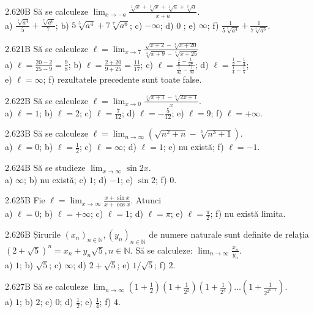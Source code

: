 \documentclass[11pt]{article}
\begin{document}
2.620B Să se calculeze $\lim _{x \rightarrow-a} \frac{\sqrt[5]{x}+\sqrt[7]{x}+\sqrt[3]{a}+\sqrt[7]{a}}{x+a}$.\\ a) $\frac{\sqrt[5]{a^{4}}}{5}+\frac{\sqrt[7]{a^{6}}}{7}$; b) $5 \sqrt[5]{a^{4}}+7 \sqrt[7]{a^{6}}$; c) $-\infty$; d) 0 ; e) $\infty$; f) $\frac{1}{5 \sqrt[5]{a^{4}}}+\frac{1}{7 \sqrt[4]{a^{6}}}$.

2.621B Să se calculeze $\ell=\lim _{x \rightarrow 7} \frac{\sqrt{x+2}-\sqrt[3]{x+20}}{\sqrt[4]{x+9}-\sqrt[5]{x+25}}$\\ a) $\ell=\frac{20-2}{25-9}=\frac{9}{8}$; b) $\ell=\frac{2+20}{9+25}=\frac{11}{17}$; c) $\ell=\frac{\frac{1}{6}-\frac{1}{27}}{\frac{1}{32}-\frac{1}{80}}$; d) $\ell=\frac{\frac{1}{2}-\frac{1}{3}}{\frac{1}{4}-\frac{1}{5}}$;\\ e) $\ell=\infty$; f) rezultatele precedente sunt toate false.

2.622B Să se calculeze $\ell=\lim _{x \rightarrow 0} \frac{\sqrt[4]{x+1}-\sqrt[3]{2 x+1}}{x}$.\\ a) $\ell=1$; b) $\ell=2$; c) $\ell=\frac{7}{12}$; d) $\ell=-\frac{5}{12}$; e) $\ell=9$; f) $\ell=+\infty$.

2.623B Să se calculeze $\ell=\lim _{n \rightarrow \infty}\left(\sqrt{n^{2}+n}-\sqrt[3]{n^{3}+1}\right)$.\\ a) $\ell=0$; b) $\ell=\frac{1}{2}$; c) $\ell=\infty$; d) $\ell=1$; e) nu există; f) $\ell=-1$.

2.624B Să se studieze $\lim _{x \rightarrow \infty} \sin 2 x$.\\ a) $\infty$; b) nu există; c) $1$; d) $-1$; e) $\sin 2$; f) $0$.

2.625B Fie $\ell=\lim _{x \rightarrow \infty} \frac{x+\sin x}{x+\cos x}$. Atunci\\ a) $\ell=0$; b) $\ell=+\infty$; c) $\ell=1$; d) $\ell=\pi$; e) $\ell=\frac{\pi}{2}$; f) nu există limita.

2.626B Șirurile $\left(x_{n}\right)_{n \in \mathbb{N}},\left(y_{n}\right)_{n \in \mathbb{N}}$ de numere naturale sunt definite de relația $(2+\sqrt{5})^{n}=x_{n}+y_{n} \sqrt{5}, n \in \mathbb{N}$. Să se calculeze: $\lim _{n \rightarrow \infty} \frac{x_{n}}{y_{n}}$.\\ a) $1$; b) $\sqrt{5}$; c) $\infty$; d) $2+\sqrt{5}$; e) $1 / \sqrt{5}$; f) $2$.

2.627B Să se calculeze $\lim _{n \rightarrow \infty}\left(1+\frac{1}{2}\right)\left(1+\frac{1}{2^{2}}\right)\left(1+\frac{1}{2^{4}}\right) \ldots\left(1+\frac{1}{2^{2^{n-1}}}\right)$.\\ a) $1$; b) $2$; c) $0$;  d) $\frac{1}{2}$; e) $\frac{1}{4}$; f) $4$.
\end{document}
